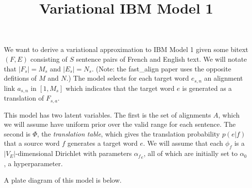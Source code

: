 \documentclass[11pt]{article}
\begin{document}
\title{Variational IBM Model 1}

\author{}

\maketitle

We want to derive a variational approximation to IBM Model 1 given some bitext $(F, E)$ consisting of $S$ sentence pairs
of French and English text. We will notate that $|F_s| = M_s$ and $|E_s| = N_s$. (Note: the fast\_align paper uses the opposite defitions of $M$ and $N$.)
The model selects for each target word $e_{s,n}$ an
alignment link $a_{s,n}$ in $[1, M_s]$ which indicates that the target word $e$ is generated as a translation of $F_{s,a}$.

This model has two latent variables. The first is the set of alignments $A$, which we will assume have uniform prior over the valid range for each sentence.
The second is $\Phi$, the \emph{translation table}, which gives the translation probability $p(e|f)$ that a source word $f$ generates a target word $e$.
We will assume that each $\phi_f$ is a $|V_E|$-dimensional Dirichlet with parameters ${\alpha_f}_e$, all of which are initially set to $\alpha_0$, a hyperparameter.

A plate diagram of this model is below.

\end{document}
